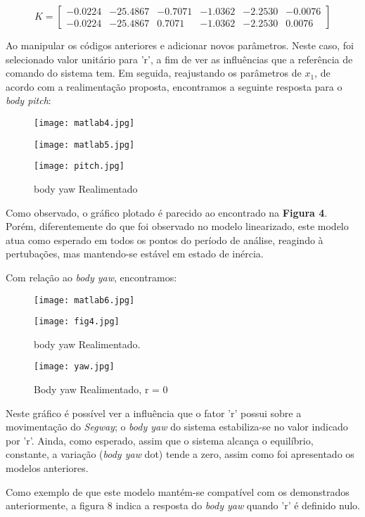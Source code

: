 \documentclass[12pt]{article}
\begin{document}
\begin{equation}
    K = \begin{bmatrix}
    - 0.0224 & -25.4867 & -0.7071 & -1.0362 & -2.2530 & -0.0076\\
    -0.0224 & -25.4867 & 0.7071 & -1.0362 & -2.2530 & 0.0076
    \end{bmatrix}
\end{equation}

\quad Ao manipular os códigos anteriores e adicionar novos parâmetros. Neste caso, foi selecionado valor unitário para 'r', a fim de ver as influências que a referência de comando do sistema tem. Em seguida, reajustando os parâmetros de $x_1$, de acordo com a realimentação proposta, encontramos a seguinte resposta para o \emph{body pitch}:

\begin{figure}[H] 
    \centering
    \texttt{[image: matlab4.jpg]}
    \label{fig:mesh3}
\end{figure}

\begin{figure}[H] 
    \centering
    \texttt{[image: matlab5.jpg]}
    \label{fig:mesh3}
\end{figure}

\begin{figure}[H] 
    \centering
    \texttt{[image: pitch.jpg]}
    \caption{body yaw Realimentado}
    \label{fig:mesh3}
\end{figure}

\quad Como observado, o gráfico plotado é parecido ao encontrado na \textbf{Figura 4}. Porém, diferentemente do que foi observado no modelo linearizado, este modelo atua como esperado em todos os pontos do período de análise, reagindo à pertubações, mas mantendo-se estável em estado de inércia.

\quad Com relação ao \emph{body yaw}, encontramos:

\begin{figure}[H] 
    \centering
    \texttt{[image: matlab6.jpg]}
    \label{fig:mesh3}
\end{figure}


\begin{figure}[H] 
    \centering
    \texttt{[image: fig4.jpg]}
    \caption{body yaw Realimentado.}
    \label{fig:mesh3}
\end{figure}

\begin{figure}[H] 
    \centering
    \texttt{[image: yaw.jpg]}
    \caption{Body yaw Realimentado, r = 0}
    \label{fig:mesh3}
\end{figure}

\quad Neste gráfico é possível ver a influência que o fator 'r' possui sobre a movimentação do \emph{Segway}; o \emph{body yaw} do sistema estabiliza-se no valor indicado por 'r'. Ainda, como esperado, assim que o sistema alcança o equilíbrio, constante, a variação (\emph{body yaw} dot) tende a zero, assim como foi apresentado os modelos anteriores.

\quad Como exemplo de que este modelo mantém-se compatível com os demonstrados anteriormente, a figura 8 indica a resposta do \emph{\emph{body yaw}} quando 'r' é definido nulo.
\end{document}
